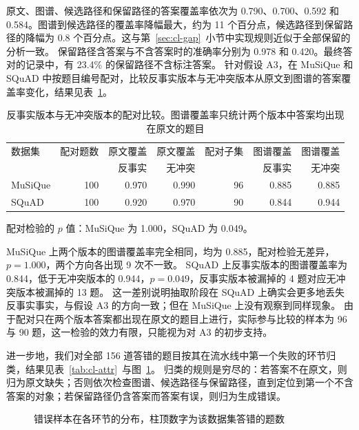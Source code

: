 原文、图谱、候选路径和保留路径的答案覆盖率依次为 0.790、0.700、0.592 和 0.584。图谱到候选路径的覆盖率降幅最大，约为 11 个百分点，候选路径到保留路径的降幅为 0.8 个百分点。这与第~\ref{sec:cl-gap}~小节中实现规则近似于全部保留的分析一致。
保留路径含答案与不含答案时的准确率分别为 0.978 和 0.420。最终答对的记录中，有 23.4\% 的保留路径不含标注答案。
针对假设 A3，在 MuSiQue 和 SQuAD 中按题目编号配对，比较反事实版本与无冲突版本从原文到图谱的答案覆盖率变化，结果见表~\ref{tab:cl-a3}。

\begin{table}[htbp]
  \centering
  \small
  \setlength{\tabcolsep}{4pt}
  \renewcommand{\arraystretch}{1.3}
  \caption{反事实版本与无冲突版本的配对比较。图谱覆盖率只统计两个版本中答案均出现在原文的题目}
  \label{tab:cl-a3}
  \begin{tabular}{lrrrrrr}
    \toprule
    数据集 & 配对题数 & 原文覆盖 & 原文覆盖 & 配对子集 & 图谱覆盖 & 图谱覆盖 \\
         &         & 反事实   & 无冲突   &         & 反事实   & 无冲突   \\
    \midrule
    MuSiQue & 100 & 0.970 & 0.990 & 96 & 0.885 & 0.885 \\
    SQuAD   & 100 & 0.920 & 0.970 & 90 & 0.844 & 0.944 \\
    \bottomrule
  \end{tabular}

  \vspace{2pt}
  {\footnotesize 配对检验的 $p$ 值：MuSiQue 为 1.000，SQuAD 为 0.049。}
\end{table}

MuSiQue 上两个版本的图谱覆盖率完全相同，均为 0.885，配对检验无差异，$p=1.000$，两个方向各出现 9 次不一致。
SQuAD 上反事实版本的图谱覆盖率为 0.844，低于无冲突版本的 0.944，$p=0.049$，反事实版本被漏掉的 4 题对应无冲突版本被漏掉的 13 题。
这一差别说明抽取阶段在 SQuAD 上确实会更多地丢失反事实事实，与假设 A3 的方向一致；但在 MuSiQue 上没有观察到同样现象。
由于配对只在两个版本答案都出现在原文的题目上进行，实际参与比较的样本为 96 与 90 题，这一检验的效力有限，只能视为对 A3 的初步支持。

进一步地，我们对全部 156 道答错的题目按其在流水线中第一个失败的环节归类，结果见表~\ref{tab:cl-attr}~与图~\ref{fig:cl-attr}。
归类的规则是穷尽的：若答案不在原文，则归为原文缺失；否则依次检查图谱、候选路径与保留路径，直到定位到第一个不含答案的对象；若保留路径仍含答案而答案有误，则归为生成错误。

\begin{figure}[htbp]
  \centering
  \caption{错误样本在各环节的分布，柱顶数字为该数据集答错的题数}
  \label{fig:cl-attr}
\end{figure}

